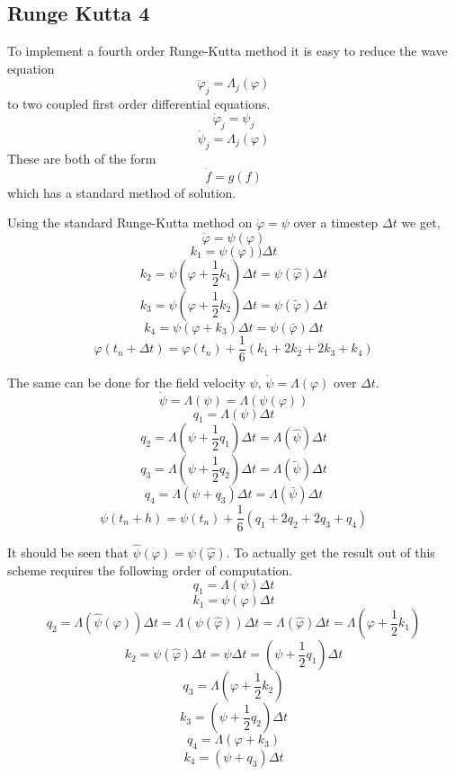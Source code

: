 \documentclass[11pt, oneside]{report}  %
\numberwithin{equation}{section}
\begin{document}
\subsection{Runge Kutta 4}
To implement a fourth order Runge-Kutta method it is easy to reduce the wave equation
$$\ddot\varphi_j = \Lambda_j(\varphi) $$
to two coupled first order differential equations.
$$ \dot \varphi_j = \psi_j$$
$$ \dot \psi_j = \Lambda_j(\varphi)$$
These are both of the form
$$ \dot f = g(f)$$
which has a standard method of solution. 

Using the standard Runge-Kutta method on $ \dot\varphi = \psi$ over a timestep $\Delta t$ we get,
$$ \dot\varphi = \psi(\varphi)$$
$$ k_1 =  \psi(\varphi))\Delta t$$
$$ k_2 =  \psi(\varphi+\frac{1}{2}k_1)\Delta t = \psi(\hat\varphi)\Delta t$$
$$ k_3 =  \psi(\varphi+\frac{1}{2}k_2)\Delta t= \psi(\tilde\varphi)\Delta t$$
$$ k_4 = \psi(\varphi+k_3)\Delta t= \psi(\bar\varphi)\Delta t$$
$$\boxed{\varphi(t_n + \Delta t) = \varphi(t_n) + \frac{1}{6}(k_1 + 2k_2 + 2k_3 + k_4) }$$

The same can be done for the field velocity $\psi$, $\dot\psi = \Lambda(\varphi)$ over $\Delta t$.
$$ \dot\psi = \Lambda(\psi) = \Lambda(\psi(\varphi))$$
$$ q_1 =  \Lambda(\psi) \Delta t$$
$$ q_2 =   \Lambda(\psi + \frac{1}{2}q_1) \Delta t = \Lambda(\hat\psi)\Delta t$$
$$ q_3 =  \Lambda(\psi + \frac{1}{2}q_2)\Delta t =\Lambda(\tilde\psi)\Delta t$$
$$ q_4 =  \Lambda(\psi + q_3)\Delta t =\Lambda(\bar\psi)\Delta t $$
$$ \boxed{\psi(t_n + h) = \psi(t_n)  + \frac{1}{6}(q_1 + 2q_2 + 2q_3 + q_4)}$$

It should be seen that $\hat\psi(\varphi) = \psi(\hat\varphi)$. To actually get the result out of this scheme requires the following order of computation.
$$ q_1 =  \Lambda(\psi) \Delta t$$
$$ k_1 =  \psi(\varphi)\Delta t$$
$$ q_2  = \Lambda(\hat\psi(\varphi))\Delta t = \Lambda(\psi(\hat\varphi))\Delta t  = \Lambda(\hat\varphi)\Delta t = \Lambda(\varphi + \frac{1}{2}k_1)$$
$$ k_2  = \psi(\hat\varphi)\Delta t = \hat\psi\Delta t = (\psi + \frac{1}{2}q_1)\Delta t$$
$$ q_3  = \Lambda(\varphi + \frac{1}{2}k_2)$$
$$ k_3  = (\psi + \frac{1}{2}q_2)\Delta t$$
$$ q_4  =  \Lambda(\varphi + k_3)$$
$$ k_4  =  (\psi + q_3)\Delta t$$
\end{document}
